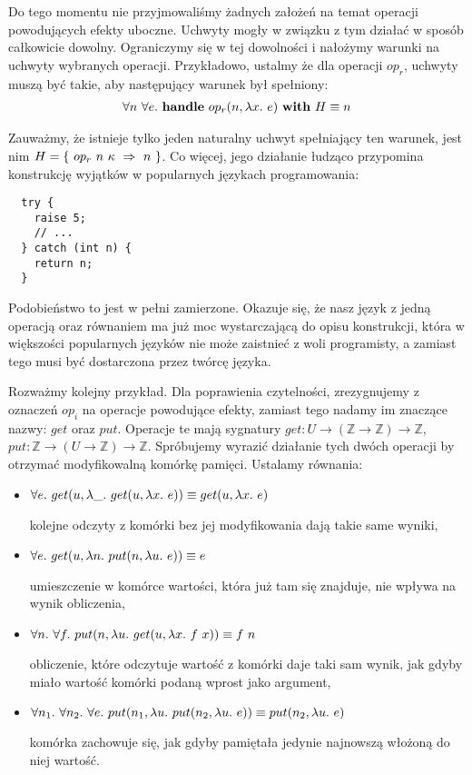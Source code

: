 Do tego momentu nie przyjmowaliśmy żadnych założeń na temat operacji powodujących efekty uboczne. Uchwyty mogły w związku z tym działać w sposób całkowicie dowolny. Ograniczymy się w tej dowolności i nałożymy warunki na uchwyty wybranych operacji. Przykładowo, ustalmy że dla operacji \(op_r\), uchwyty muszą być takie, aby następujący warunek był spełniony:
\begin{align}
  \forall n\ \forall e.\ \mathbf{handle}\ op_r(n, \lambda x.\ e)\ \mathbf{with}\ H \equiv n
\end{align}

Zauważmy, że istnieje tylko jeden naturalny uchwyt spełniający ten warunek, jest nim \(H = \{\ \hcase{op_r}{n\ \kappa}{n} \ \}\). Co więcej, jego działanie łudząco przypomina konstrukcję wyjątków w popularnych językach programowania:

\begin{lstlisting}
  try {
    raise 5;
    // ...
  } catch (int n) {
    return n;
  }
\end{lstlisting}

Podobieństwo to jest w pełni zamierzone. Okazuje się, że nasz język z jedną operacją oraz równaniem ma już moc wystarczającą do opisu konstrukcji, która w większości popularnych języków nie może zaistnieć z woli programisty, a zamiast tego musi być dostarczona przez twórcę języka.

Rozważmy kolejny przykład. Dla poprawienia czytelności, zrezygnujemy z oznaczeń \(op_i\) na operacje powodujące efekty, zamiast tego nadamy im znaczące nazwy: \(get\) oraz \(put\). Operacje te mają sygnatury \(get: U \rightarrow (\mathbb{Z} \rightarrow \mathbb{Z}) \rightarrow \mathbb{Z}\), \(put: \mathbb{Z} \rightarrow (U \rightarrow \mathbb{Z}) \rightarrow \mathbb{Z}\). Spróbujemy wyrazić działanie tych dwóch operacji by otrzymać modyfikowalną komórkę pamięci. Ustalamy równania:

\begin{itemize}
\item \(\forall e.\ get(u, \lambda \_.\ get(u, \lambda x.\ e)) \equiv get(u, \lambda x.\ e)\)

  kolejne odczyty z komórki bez jej modyfikowania dają takie same wyniki,
\item \(\forall e.\ get(u, \lambda n.\ put(n, \lambda u.\ e)) \equiv e\)

  umieszczenie w komórce wartości, która już tam się znajduje, nie wpływa na wynik obliczenia,
\item \(\forall n.\ \forall f.\ put(n, \lambda u.\ get(u, \lambda x.\ f\ x)) \equiv f\ n\)

  obliczenie, które odczytuje wartość z komórki daje taki sam wynik, jak gdyby miało wartość komórki podaną wprost jako argument,
\item \(\forall n_1.\ \forall n_2.\ \forall e.\ put(n_1, \lambda u.\ put(n_2, \lambda u.\ e)) \equiv put(n_2, \lambda u.\ e)\)

  komórka zachowuje się, jak gdyby pamiętała jedynie najnowszą włożoną do niej wartość.
\end{itemize}

